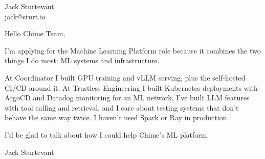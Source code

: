 \documentclass[11pt]{article}
\begin{document}
\raggedright

{\namefont\fontsize{20pt}{24pt}\selectfont Jack Sturtevant}\\[-0.3em]
jack@sturt.io

\vspace{1.2em}

Hello Chime Team,

I'm applying for the Machine Learning Platform role because it combines the two things I do most: ML systems and infrastructure.

At Coordinator I built GPU training and vLLM serving, plus the self-hosted CI/CD around it. At Trustless Engineering I built Kubernetes deployments with ArgoCD and Datadog monitoring for an ML network. I've built LLM features with tool calling and retrieval, and I care about testing systems that don't behave the same way twice. I haven't used Spark or Ray in production.

I'd be glad to talk about how I could help Chime's ML platform.

\vspace{0.6em}
Jack Sturtevant
\end{document}
